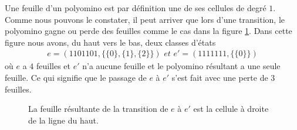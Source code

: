  Une feuille d'un polyomino est par définition une de ses cellules de degré $1$. Comme nous pouvons le constater, il peut arriver que lors d'une transition, le polyomino gagne ou perde des feuilles comme le cas dans la figure \ref{ref1}. Dans cette figure nous avons, du haut vers le bas, deux classes d'états
 \begin{eqnarray*}
e=(1101101,\{\{0\},\{1\},\{2\}\})  \textit{ et } e'=(1111111,\{\{0\}\})
\end{eqnarray*}
 où $e$ a $4$ feuilles et  $e'$ n'a aucune feuille et le polyomino résultant a une seule feuille. Ce qui signifie que le passage de $e$ à $e'$ s'est fait avec une perte de $3$ feuilles. 
 \begin{figure}[!htb]
\begin{minipage}[c]{.26\linewidth}
        \centering
\end{minipage}
\hfill
\begin{minipage}[c]{.6\linewidth}
        \centering
\begin{logicpuzzle}[rows=2,columns=7,color=cyan!100, width=750px,scale=0.5]
\framepuzzle[black!50]
\end{logicpuzzle}
\end{minipage}
\caption{\label{ref1} La feuille résultante de la transition de $e$ à $e'$ est la cellule à droite de la ligne du haut.}
\end{figure} 
 
